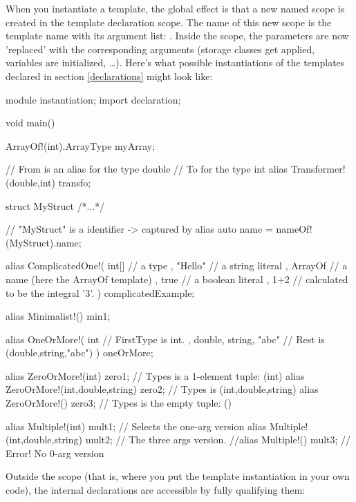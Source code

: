 When you instantiate a template, the global effect is that a new named scope is created in the template declaration scope. The name of this new scope is the template name with its argument list: . Inside the scope, the parameters are now 'replaced' with the corresponding arguments (storage classes get applied, variables are initialized, \ldots). Here's what possible instantiations of the templates declared in section \ref{declarations} might look like:
\begin{dcode}
module instantiation;
import declaration;

void main()
{
    ArrayOf!(int).ArrayType myArray;

	 // From is an alias for the type double
	 // To for the type int
    alias Transformer!(double,int) transfo; 

    struct MyStruct { /*...*/ }
    
    // "MyStruct" is a identifier -> captured by alias
    auto name = nameOf!(MyStruct).name; 
    
    alias   
    ComplicatedOne!( int[]   // a type
                   , "Hello" // a string literal
                   , ArrayOf // a name (here the ArrayOf template)
                   , true    // a boolean literal
                   , 1+2     // calculated to be the integral '3'.
                   ) complicatedExample;

    alias Minimalist!() min1;

    alias
    OneOrMore!( int                   // FirstType is int.
              , double, string, "abc" // Rest is (double,string,"abc")
              ) oneOrMore;

    alias ZeroOrMore!(int) zero1; // Types is a 1-element tuple: (int)
    alias ZeroOrMore!(int,double,string) zero2; // Types is (int,double,string)
    alias ZeroOrMore!() zero3;                  // Types is the empty tuple: ()

    alias Multiple!(int) mult1;               // Selects the one-arg version
    alias Multiple!(int,double,string) mult2; // The three args version.
    //alias Multiple!() mult3;                // Error! No 0-arg version
}
\end{dcode}

Outside the scope (that is, where you put the template instantiation in your own code), the internal declarations are accessible by fully qualifying them:

